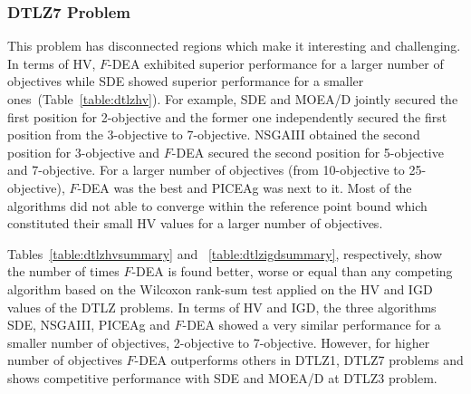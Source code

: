 \documentclass[review]{elsarticle}
\begin{document}

\subsubsection{DTLZ7 Problem}
This problem has disconnected regions which make it interesting and challenging. In terms of HV, 
$F$-DEA exhibited superior performance for a larger number of objectives while SDE showed superior performance for a smaller ones~(Table~\ref{table:dtlzhv}). For example, 
SDE and MOEA/D jointly secured the first position  for 2-objective and the former one independently secured the first position from the 3-objective to 7-objective. NSGAIII obtained the second position for 3-objective 
and $F$-DEA secured the second position for  5-objective 
and 7-objective. For a larger number of objectives (from 10-objective to 25-objective), 
$F$-DEA was the best and PICEAg was next to it.
Most of the algorithms did not able to converge within the reference point bound  which constituted their small HV values for a larger
number of objectives.


Tables~\ref{table:dtlzhvsummary} and ~\ref{table:dtlzigdsummary}, respectively, show the number of times $F$-DEA is found better, worse or equal than any competing algorithm based on the Wilcoxon rank-sum test applied on the HV and IGD values of the DTLZ problems. 
In terms of HV and IGD, the three algorithms SDE, NSGAIII, PICEAg and $F$-DEA showed a very similar performance  for a smaller number of objectives, 2-objective to 7-objective. However, for higher number of objectives $F$-DEA outperforms others in DTLZ1, DTLZ7 problems and shows competitive performance with SDE and MOEA/D at DTLZ3 problem. %
\end{document}
